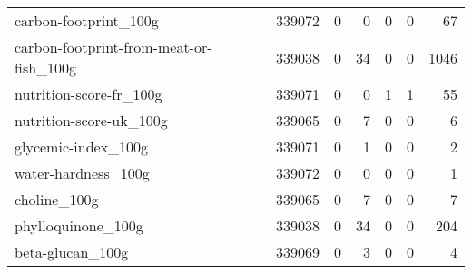 \begin{tabular}{lrrrrrr}
carbon-footprint\_100g                      &                                        339072 &                                         0 &                                             0 &                                         0 &                      0 &               67 \\
carbon-footprint-from-meat-or-fish\_100g    &                                        339038 &                                         0 &                                            34 &                                         0 &                      0 &             1046 \\
nutrition-score-fr\_100g                    &                                        339071 &                                         0 &                                             0 &                                         1 &                      1 &               55 \\
nutrition-score-uk\_100g                    &                                        339065 &                                         0 &                                             7 &                                         0 &                      0 &                6 \\
glycemic-index\_100g                        &                                        339071 &                                         0 &                                             1 &                                         0 &                      0 &                2 \\
water-hardness\_100g                        &                                        339072 &                                         0 &                                             0 &                                         0 &                      0 &                1 \\
choline\_100g                               &                                        339065 &                                         0 &                                             7 &                                         0 &                      0 &                7 \\
phylloquinone\_100g                         &                                        339038 &                                         0 &                                            34 &                                         0 &                      0 &              204 \\
beta-glucan\_100g                           &                                        339069 &                                         0 &                                             3 &                                         0 &                      0 &                4 \\

\end{tabular}
